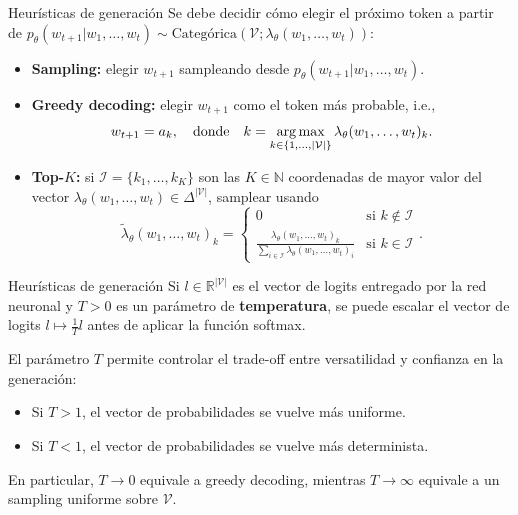 \documentclass{beamer}
\newcommand{\R}{\mathbb{R}}
\newcommand{\N}{\mathbb{N}}
\begin{document}
\begin{frame}{Heurísticas de generación}
    Se debe decidir cómo elegir el próximo token a partir de $p_\theta(w_{t+1}|w_1,\ldots,w_t)\sim\text{Categórica}\left(\mathcal{V};\lambda_\theta(w_1,\ldots,w_t)\right)$:
    \begin{itemize}
        \item \textbf{Sampling:} elegir $w_{t+1}$ sampleando desde $p_\theta(w_{t+1}|w_1,\ldots,w_t)$.
        \item \textbf{Greedy decoding:} elegir $w_{t+1}$ como el token más probable, i.e.,
              \begin{equation*}
                  w_{t+1}=a_k,\quad\text{donde}\quad
                  k=\operatornamewithlimits{arg\,max}_{k\in\{1,\ldots,|\mathcal{V}|\}} \lambda_\theta(w_1,\ldots,w_t)_k.
              \end{equation*}
        \item \textbf{Top-$K$:} si $\mathcal{I}=\{k_1,\ldots,k_K\}$ son las $K\in\N$ coordenadas de mayor valor del vector $\lambda_\theta(w_1,\ldots,w_t)\in\Delta^{|\mathcal{V}|}$, samplear usando
              \begin{equation*}
                  \tilde\lambda_\theta(w_1,\ldots,w_t)_k=
                  \begin{cases}
                      0                                                                                               & \text{si }k\not\in\mathcal{I} \\
                      \frac{\lambda_\theta(w_1,\ldots,w_t)_k}{\sum_{i\in\mathcal{I}}\lambda_\theta(w_1,\ldots,w_t)_i} & \text{si } k\in\mathcal{I}
                  \end{cases}.
              \end{equation*}
    \end{itemize}
\end{frame}

\begin{frame}{Heurísticas de generación}
    Si $l\in\R^{|\mathcal{V}|}$ es el vector de logits entregado por la red neuronal y $T>0$ es un parámetro de \textbf{temperatura}, se puede escalar el vector de logits $l\mapsto \frac{1}{T}l$ antes de aplicar la función softmax.

    El parámetro $T$ permite controlar el trade-off entre versatilidad y confianza en la generación:
    \begin{itemize}
        \item Si $T>1$, el vector de probabilidades se vuelve más uniforme.
        \item Si $T<1$, el vector de probabilidades se vuelve más determinista.
    \end{itemize}
    En particular, $T\to 0$ equivale a greedy decoding, mientras $T\to\infty$ equivale a un sampling uniforme sobre $\mathcal{V}$.
\end{frame}
\end{document}
